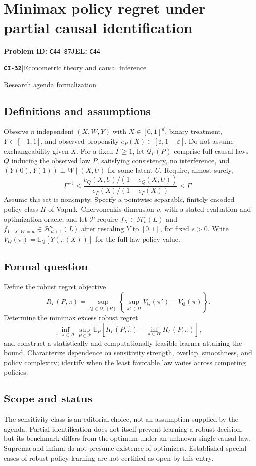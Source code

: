 \documentclass[11pt,a4paper]{article}
\newcommand{\E}{\mathbb E}
\newcommand{\entrymeta}[3]{{\sffamily\small\color{muted}\textbf{\texttt{#1}}\quad|\quad #2\par #3\par}}
\begin{document}
\section*{Minimax policy regret under partial causal identification}
\textbf{Problem ID:} \texttt{C44-87}\quad \textbf{JEL:} \texttt{C44}\par
\label{problem:OP-0511}
\label{beyond:CI-32}
\entrymeta{CI-32}{Econometric theory and causal inference}{Research agenda formalization}
\subsection*{Definitions and assumptions}
Observe $n$ independent $(X,W,Y)$ with $X\in[0,1]^d$, binary treatment, $Y\in[-1,1]$, and observed propensity $e_P(X)\in[\varepsilon,1-\varepsilon]$. Do not assume exchangeability given $X$. For a fixed $\Gamma\geq1$, let $\mathcal Q_\Gamma(P)$ comprise full causal laws $Q$ inducing the observed law $P$, satisfying consistency, no interference, and $(Y(0),Y(1))\perp W\mid(X,U)$ for some latent $U$. Require, almost surely,
\[
 \Gamma^{-1}\leq
 \frac{e_Q(X,U)/(1-e_Q(X,U))}{e_P(X)/(1-e_P(X))}
 \leq\Gamma.
\]
Assume this set is nonempty. Specify a pointwise separable, finitely encoded policy class $\Pi$ of Vapnik--Chervonenkis dimension $v$, with a stated evaluation and optimization oracle, and let $\mathcal P$ require $f_X\in\mathcal H_d^s(L)$ and $f_{Y\mid X,W=w}\in\mathcal H_{d+1}^s(L)$ after rescaling $Y$ to $[0,1]$, for fixed $s>0$. Write $V_Q(\pi)=\E_Q[Y(\pi(X))]$ for the full-law policy value.
\subsection*{Formal question}
Define the robust regret objective
\[
 R_\Gamma(P,\pi)=\sup_{Q\in\mathcal Q_\Gamma(P)}
 \left\{\sup_{\pi'\in\Pi}V_Q(\pi')-V_Q(\pi)\right\}.
\]
Determine the minimax excess robust regret
\[
 \inf_{\widehat\pi:\,\widehat\pi\in\Pi}\sup_{P\in\mathcal P}
 \E_P\left[R_\Gamma(P,\widehat\pi)-
       \inf_{\pi\in\Pi}R_\Gamma(P,\pi)\right],
\]
and construct a statistically and computationally feasible learner attaining the bound. Characterize dependence on sensitivity strength, overlap, smoothness, and policy complexity; identify when the least favorable law varies across competing policies.
\subsection*{Scope and status}
The sensitivity class is an editorial choice, not an assumption supplied by the agenda. Partial identification does not itself prevent learning a robust decision, but its benchmark differs from the optimum under an unknown single causal law. Suprema and infima do not presume existence of optimizers. Established special cases of robust policy learning are not certified as open by this entry.
\end{document}
